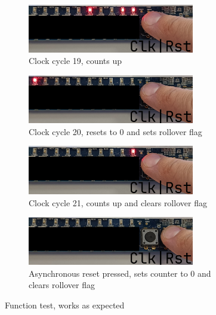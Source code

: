 \documentclass{article}
\begin{document}
\clearpage
\begin{figure}[h]\ContinuedFloat
    \centering
    \begin{subfigure}[t]{1\textwidth}
        \centering
        \includegraphics[width=0.8\textwidth]{Figures/Part1_5.jpg}
        \caption{Clock cycle 19, counts up}
        \label{fig:p1_5}
    \end{subfigure}

    \begin{subfigure}[t]{1\textwidth}
        \centering
        \includegraphics[width=0.8\textwidth]{Figures/Part1_6.jpg}
        \caption{Clock cycle 20, resets to 0 and sets rollover flag}
        \label{fig:p1_6}
    \end{subfigure}

    \begin{subfigure}[t]{1\textwidth}
        \centering
        \includegraphics[width=0.8\textwidth]{Figures/Part1_7.jpg}
        \caption{Clock cycle 21, counts up and clears rollover flag}
        \label{fig:p1_7}
    \end{subfigure}

    \begin{subfigure}[t]{1\textwidth}
        \centering
        \includegraphics[width=0.8\textwidth]{Figures/Part1_8.jpg}
        \caption{Asynchronous reset pressed, sets counter to 0 and clears rollover flag}
        \label{fig:p1_8}
    \end{subfigure}

    \caption[]{Function test, works as expected}
\end{figure}
\end{document}
